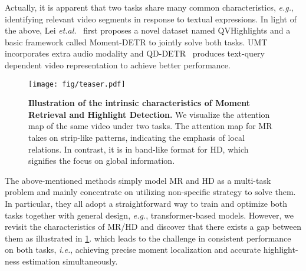 \documentclass[10pt,twocolumn,letterpaper]{article}
\begin{document}
Actually, it is apparent that two tasks share many common characteristics, \textit{e.g.}, identifying relevant video segments in response to textual expressions.   
In light of the above, Lei \textit{et.al.}~\cite{momentdetr} first proposes a novel dataset named QVHighlights and a basic framework called Moment-DETR to jointly solve both tasks.
UMT~\cite{umt} incorporates extra audio modality and QD-DETR~\cite{qddetr} produces text-query dependent video representation to achieve better performance.
\begin{figure}
    \centering
    \texttt{[image: fig/teaser.pdf]}
    \caption{\textbf{Illustration of the intrinsic characteristics of Moment Retrieval and Highlight Detection.} We visualize the attention map of the same video under two tasks. 
    The attention map for MR takes on strip-like patterns, indicating the emphasis of local relations. In contrast, it is in band-like format for HD, which signifies the focus on global information.}
    \label{fig:teaser}
    \vspace{-10pt}
\end{figure}
The above-mentioned methods simply model MR and HD as a multi-task problem and mainly concentrate on utilizing non-specific strategy to solve them. 
In particular, they all adopt a straightforward way to train and optimize both tasks together with general design, \textit{e.g.}, transformer-based models.
However, we revisit the characteristics of MR/HD and discover that there exists a gap between them as illustrated in \cref{fig:teaser}. 
which leads to  
the challenge in consistent performance on both tasks, \textit{i.e.}, achieving precise moment localization and accurate highlight-ness estimation simultaneously.
\end{document}
